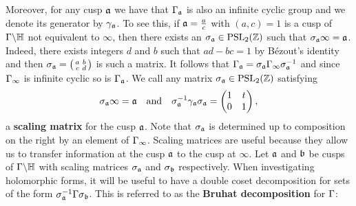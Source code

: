     Moreover, for any cusp $\mathfrak{a}$ we have that $\Gamma_{\mathfrak{a}}$ is also an infinite cyclic group and we denote its generator by $\gamma_{\mathfrak{a}}$. To see this, if $\mathfrak{a} = \frac{a}{c}$ with $(a,c) = 1$ is a cusp of $\Gamma\backslash\mathbb{H}$ not equivalent to $\infty$, then there exists an $\sigma_{\mathfrak{a}} \in \mathrm{PSL}_{2}(\mathbb{Z})$ such that $\sigma_{\mathfrak{a}}\infty = \mathfrak{a}$. Indeed, there exists integers $d$ and $b$ such that $ad-bc = 1$ by B\'ezout's identity and then $\sigma_{\mathfrak{a}} = \begin{psmallmatrix} a & b \\ c & d \end{psmallmatrix}$ is such a matrix. It follows that $\Gamma_{\mathfrak{a}} = \sigma_{\mathfrak{a}}\Gamma_{\infty}\sigma_{\mathfrak{a}}^{-1}$ and since $\Gamma_{\infty}$ is infinite cyclic so is $\Gamma_{\mathfrak{a}}$. We call any matrix $\sigma_{\mathfrak{a}} \in \mathrm{PSL}_{2}(\mathbb{Z})$ satisfying 
    \[
      \sigma_{\mathfrak{a}}\infty = \mathfrak{a} \quad \text{and} \quad \sigma_{\mathfrak{a}}^{-1}\gamma_{\mathfrak{a}}\sigma_{\mathfrak{a}} = \begin{pmatrix} 1 & t \\ 0 & 1 \end{pmatrix},
    \]
    a \textbf{scaling matrix} for the cusp $\mathfrak{a}$. Note that $\sigma_{\mathfrak{a}}$ is determined up to composition on the right by an element of $\Gamma_{\infty}$. Scaling matrices are useful because they allow us to transfer information at the cusp $\mathfrak{a}$ to the cusp at $\infty$. Let $\mathfrak{a}$ and $\mathfrak{b}$ be cusps of $\Gamma\backslash\mathbb{H}$ with scaling matrices $\sigma_{\mathfrak{a}}$ and $\sigma_{\mathfrak{b}}$ respectively. When investigating holomorphic forms, it will be useful to have a double coset decomposition for sets of the form $\sigma_{\mathfrak{a}}^{-1}\Gamma\sigma_{\mathfrak{b}}$. This is referred to as the \textbf{Bruhat decomposition} for $\Gamma$:

